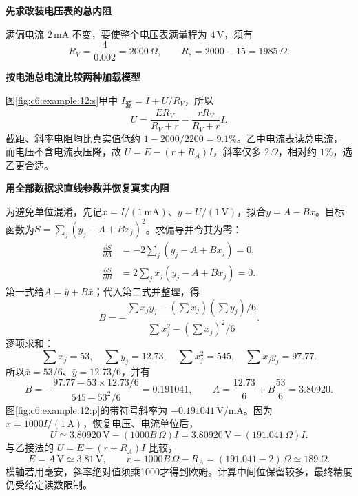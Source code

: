 \begin{solution}\textbf{先求改装电压表的总内阻}\par\nobreak

满偏电流 $2\,\mathrm{mA}$ 不变，要使整个电压表满量程为 $4\,\mathrm V$，须有
\[
R_V=\frac4{0.002}=2000\,\Omega,\qquad R_s=2000-15=1985\,\Omega.
\]


\par\medskip{}\noindent\textbf{按电池总电流比较两种加载模型}\par\nobreak

图\ref{fig:c6:example:12:s}甲中 $I_{\text{源}}=I+U/R_V$，所以
\[
 U=\frac{ER_V}{R_V+r}-\frac{rR_V}{R_V+r}I.
\]
截距、斜率电阻均比真实值低约 $1-2000/2200=9.1\%$。乙中电流表读总电流，而电压不含电流表压降，故 $U=E-(r+R_A)I$，斜率仅多 $2\,\Omega$，相对约 $1\%$，选乙更合适。



\par\medskip{}\noindent\textbf{用全部数据求直线参数并恢复真实内阻}\par\nobreak

为避免单位混淆，先记$x=I/(1\,\mathrm{mA})$、$y=U/(1\,\mathrm V)$，拟合$y=A-Bx$。目标函数为$S=\sum_j(y_j-A+Bx_j)^2$。求偏导并令其为零：
\begin{align*}
\frac{\partial S}{\partial A}&=-2\sum_j(y_j-A+Bx_j)=0,\\
\frac{\partial S}{\partial B}&=2\sum_jx_j(y_j-A+Bx_j)=0.
\end{align*}
第一式给$A=\bar y+B\bar x$；代入第二式并整理，得
\[
B=-\frac{\sum x_jy_j-(\sum x_j)(\sum y_j)/6}
{\sum x_j^2-(\sum x_j)^2/6}.
\]
逐项求和：
\[
\sum x_j=53,\quad \sum y_j=12.73,\quad
\sum x_j^2=545,\quad \sum x_jy_j=97.77.
\]
所以$\bar x=53/6$、$\bar y=12.73/6$，并有
\[
B=-\frac{97.77-53\times12.73/6}{545-53^2/6}
=0.191041,\qquad
A=\frac{12.73}{6}+B\frac{53}{6}=3.80920.
\]
图\ref{fig:c6:example:12:p}的带符号斜率为 $-0.191041\,\mathrm{V/mA}$。因为 $x=1000I/(1\,\mathrm A)$，恢复电压、电流单位后，
\[
 U\simeq3.80920\,\mathrm V-(1000B\,\Omega)I
 =3.80920\,\mathrm V-(191.041\,\Omega)I.
\]
与乙接法的 $U=E-(r+R_A)I$ 比较，
\[
 E=A\,\mathrm V\simeq3.81\,\mathrm V,\qquad
 r=1000B\,\Omega-R_A=(191.041-2)\,\Omega\simeq189\,\Omega.
\]
横轴若用毫安，斜率绝对值须乘1000才得到欧姆。计算中间位保留较多，最终精度仍受给定读数限制。
\end{solution}

